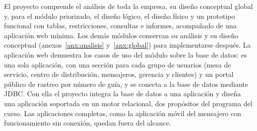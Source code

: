 %



El proyecto comprende el análisis de toda la empresa, su diseño
conceptual global y, para el módulo priorizado, el diseño lógico, el
diseño físico y un prototipo funcional con tablas, restricciones,
consultas e informes, acompañado de una aplicación web mínima. Los demás
módulos conservan su análisis y su diseño conceptual
(anexos~\ref{anx:analisis} y~\ref{anx:global}) para implementarse
después. La aplicación web demuestra los casos de uso del módulo sobre la
base de datos: es una sola aplicación, con una sección para cada grupo de
usuarios (mesa de servicio, centro de distribución, mensajeros,
gerencia y clientes) y un portal público de rastreo por número de guía, y
se conecta a la base de datos mediante JDBC. Con ella el proyecto
integra la base de datos a una aplicación y diseña una aplicación
soportada en un motor relacional, dos propósitos del programa del curso.
Las aplicaciones completas, como la aplicación móvil del mensajero con
funcionamiento sin conexión, quedan fuera del alcance.



